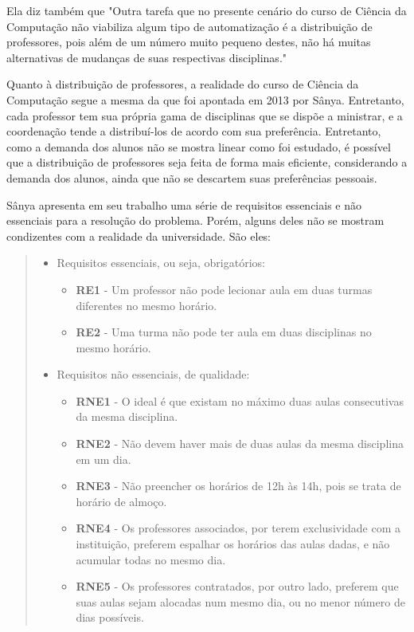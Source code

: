             Ela diz também que "Outra tarefa que no presente cenário do curso de Ciência da Computação não viabiliza algum tipo de automatização é a distribuição de professores, pois além de um número muito pequeno destes, não há muitas alternativas de mudanças de suas respectivas disciplinas."

            Quanto à distribuição de professores, a realidade do curso de Ciência da Computação segue a mesma da que foi apontada em 2013 por Sânya. Entretanto, cada professor tem sua própria gama de disciplinas que se dispõe a ministrar, e a coordenação tende a distribuí-los de acordo com sua preferência. Entretanto, como a demanda dos alunos não se mostra linear como foi estudado, é possível que a distribuição de professores seja feita de forma mais eficiente, considerando a demanda dos alunos, ainda que não se descartem suas preferências pessoais.

            Sânya apresenta em seu trabalho uma série de requisitos essenciais e não essenciais para a resolução do problema. Porém, alguns deles não se mostram condizentes com a realidade da universidade. São eles:

            \begin{quote}\footnotesize
                \begin{itemize}
                    \item Requisitos essenciais, ou seja, obrigatórios:
                    \begin{itemize}
                        \item \textbf{RE1} - Um professor não pode lecionar aula em duas turmas diferentes no mesmo horário.
                        \item \textbf{RE2} - Uma turma não pode ter aula em duas disciplinas no mesmo horário.
                    \end{itemize}
                    \item Requisitos não essenciais, de qualidade:
                    \begin{itemize}
                        \item \textbf{RNE1} - O ideal é que existam no máximo duas aulas consecutivas da mesma disciplina.
                        \item \textbf{RNE2} - Não devem haver mais de duas aulas da mesma disciplina em um dia.
                        \item \textbf{RNE3} - Não preencher os horários de 12h às 14h, pois se trata de horário de almoço.
                        \item \textbf{RNE4} - Os professores associados, por terem exclusividade com a instituição, preferem espalhar os horários das aulas dadas, e não acumular todas no mesmo dia.
                        \item \textbf{RNE5} - Os professores contratados, por outro lado, preferem que suas aulas sejam alocadas num mesmo dia, ou no menor número de dias possíveis.
                    \end{itemize}
                \end{itemize}
            \end{quote}


